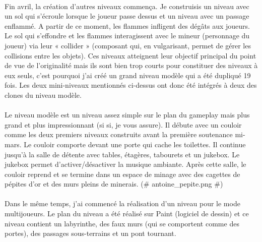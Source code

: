 \documentclass[titlepage, 13px, a4paper]{report}
\begin{document}
\paragraph{} \hspace{0pt} 
Fin avril, la création d'autres niveaux commença. Je construisis un niveau avec un
sol qui s'écroule lorsque le joueur passe dessus et un niveau avec un passage
enflammé. A partir de ce moment, les flammes infligent des dégâts aux joueurs. Le
sol qui s'effondre et les flammes interagissent avec le mineur (personnage du
joueur) via leur « collider » (composant qui, en vulgarisant, permet de gérer les
collisions entre les objets). Ces niveaux atteignent leur objectif principal du point de vue de
l'originalité mais ils sont bien trop courts pour constituer des niveaux à eux seuls,
c'est pourquoi j'ai créé un grand niveau modèle qui a été dupliqué 19 fois. Les
deux mini-niveaux mentionnés ci-dessus ont donc été intégrés à deux des clones du
niveau modèle. \\


\paragraph{} \hspace{0pt}
Le niveau modèle est un niveau assez simple sur le plan du gameplay mais plus
grand et plus impressionnant (si si, je vous assure). Il débute avec un couloir
comme les deux premiers niveaux construits avant la première soutenance mi-mars. 
Le couloir comporte devant une porte qui cache les toilettes. Il continue jusqu'à
la salle de détente avec tables, étagères, tabourets et un jukebox. Le jukebox
permet d'activer/désactiver la musique ambiante. Après cette salle, le couloir
reprend et se termine dans un espace de minage avec des cagettes de pépites
d'or et des murs pleins de minerais. \@(\# antoine\_pepite.png \#)\@   \\


\paragraph{} \hspace{0pt} 
Dans le même temps, j'ai commencé la réalisation d'un niveau pour le mode
multijoueurs. Le plan du niveau a été réalisé sur Paint (logiciel de dessin) et ce
niveau contient un labyrinthe, des faux murs (qui se comportent comme des
portes), des passages sous-terrains et un pont tournant. \\
\end{document}

